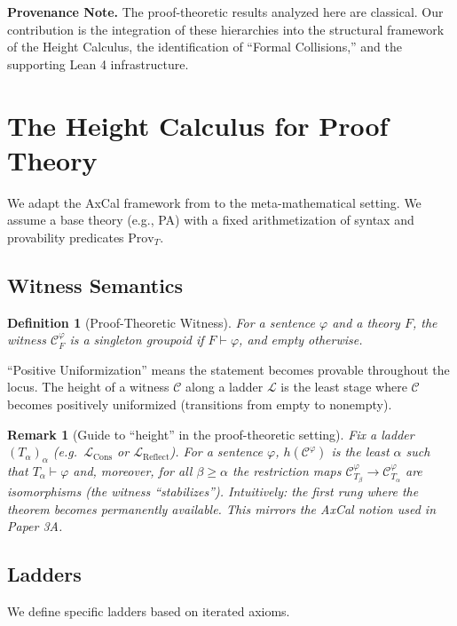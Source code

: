 \documentclass[11pt]{article}
\newtheorem{definition}[theorem]{Definition}
\newtheorem{remark}[theorem]{Remark}
\newcommand{\LCons}{\mathcal{L}_{\mathrm{Cons}}}
\newcommand{\LReflect}{\mathcal{L}_{\mathrm{Reflect}}}
\newcommand{\Prov}{\mathrm{Prov}}
\begin{document}
\begin{mdframed}[style=provenance]
\textbf{Provenance Note.} The proof-theoretic results analyzed here are classical. Our contribution is the integration of these hierarchies into the structural framework of the Height Calculus, the identification of ``Formal Collisions,'' and the supporting Lean 4 infrastructure.
\end{mdframed}

\section{The Height Calculus for Proof Theory}
We adapt the AxCal framework from \cite{Paper3a} to the meta-mathematical setting. We assume a base theory (e.g., PA) with a fixed arithmetization of syntax and provability predicates $\Prov_T$.

\subsection{Witness Semantics}
\begin{definition}[Proof-Theoretic Witness]
For a sentence $\varphi$ and a theory $F$, the witness $\mathcal C^\varphi_F$ is a singleton groupoid if $F\vdash \varphi$, and empty otherwise.
\end{definition}
``Positive Uniformization'' means the statement becomes provable throughout the locus. The height of a witness $\mathcal{C}$ along a ladder $\mathcal{L}$ is the least stage where $\mathcal{C}$ becomes positively uniformized (transitions from empty to nonempty).

\begin{remark}[Guide to ``height'' in the proof-theoretic setting]
Fix a ladder $(T_\alpha)_\alpha$ (e.g.\ $\LCons$ or $\LReflect$). For a sentence $\varphi$,
$h(\mathcal C^\varphi)$ is the least $\alpha$ such that $T_\alpha \vdash \varphi$ and, moreover,
for all $\beta\ge \alpha$ the restriction maps $\mathcal C^\varphi_{T_\beta}\to \mathcal C^\varphi_{T_\alpha}$
are isomorphisms (the witness ``stabilizes''). Intuitively: the first rung where the theorem becomes
permanently available. This mirrors the AxCal notion used in Paper 3A.
\end{remark}

\subsection{Ladders}
We define specific ladders based on iterated axioms.
\end{document}
